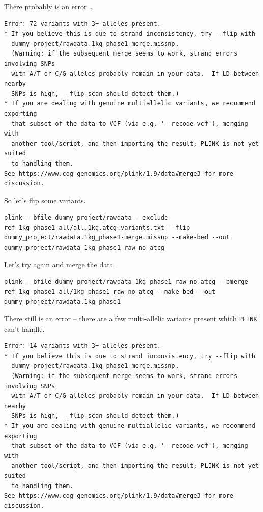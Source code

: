 \documentclass[
]{book}
\newcommand{\passthrough}[1]{#1}
\begin{document}
There probably is an error \ldots{}

\begin{lstlisting}
Error: 72 variants with 3+ alleles present.
* If you believe this is due to strand inconsistency, try --flip with
  dummy_project/rawdata.1kg_phase1-merge.missnp.
  (Warning: if the subsequent merge seems to work, strand errors involving SNPs
  with A/T or C/G alleles probably remain in your data.  If LD between nearby
  SNPs is high, --flip-scan should detect them.)
* If you are dealing with genuine multiallelic variants, we recommend exporting
  that subset of the data to VCF (via e.g. '--recode vcf'), merging with
  another tool/script, and then importing the result; PLINK is not yet suited
  to handling them.
See https://www.cog-genomics.org/plink/1.9/data#merge3 for more discussion.
\end{lstlisting}

So let's flip some variants.

\begin{lstlisting}
plink --bfile dummy_project/rawdata --exclude ref_1kg_phase1_all/all.1kg.atcg.variants.txt --flip dummy_project/rawdata.1kg_phase1-merge.missnp --make-bed --out dummy_project/rawdata_1kg_phase1_raw_no_atcg
\end{lstlisting}

Let's try again and merge the data.

\begin{lstlisting}
plink --bfile dummy_project/rawdata_1kg_phase1_raw_no_atcg --bmerge ref_1kg_phase1_all/1kg_phase1_raw_no_atcg --make-bed --out dummy_project/rawdata.1kg_phase1
\end{lstlisting}

There still is an error -- there are a few multi-allelic variants present which \passthrough{\lstinline!PLINK!} can't handle.

\begin{lstlisting}
Error: 14 variants with 3+ alleles present.
* If you believe this is due to strand inconsistency, try --flip with
  dummy_project/rawdata.1kg_phase1-merge.missnp.
  (Warning: if the subsequent merge seems to work, strand errors involving SNPs
  with A/T or C/G alleles probably remain in your data.  If LD between nearby
  SNPs is high, --flip-scan should detect them.)
* If you are dealing with genuine multiallelic variants, we recommend exporting
  that subset of the data to VCF (via e.g. '--recode vcf'), merging with
  another tool/script, and then importing the result; PLINK is not yet suited
  to handling them.
See https://www.cog-genomics.org/plink/1.9/data#merge3 for more discussion.
\end{lstlisting}
\end{document}
